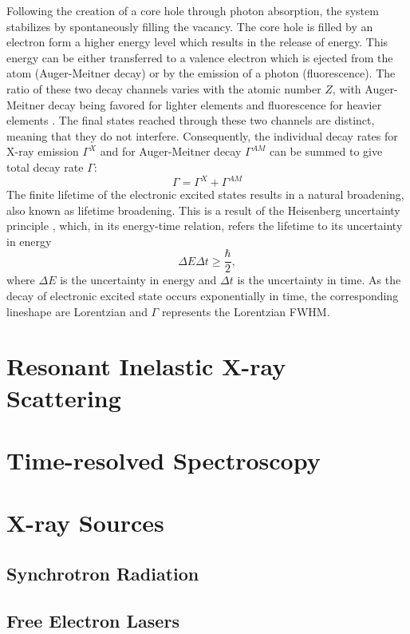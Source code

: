 Following the creation of a core hole through photon absorption, the system stabilizes by spontaneously filling the vacancy. The core hole is filled by an electron form a higher energy level which results in the release of energy. This energy can be either transferred to a valence electron which is ejected from the atom (Auger-Meitner decay) or by the emission of a photon (fluorescence). The ratio of these two decay channels varies with the atomic number $Z$, with Auger-Meitner decay being favored for lighter elements and fluorescence for heavier elements \cite{kotani2001resonant}. The final states reached through these two channels are distinct, meaning that they do not interfere. Consequently, the individual decay rates for X-ray emission $\Gamma^{X}$ and for Auger-Meitner decay $\Gamma^{AM}$ can be summed to give total decay rate $\Gamma$:
\begin{equation}
    \Gamma = \Gamma^{X} + \Gamma^{AM}
    \label{eq:decay_rate_XAS}
\end{equation}
The finite lifetime of the electronic excited states results in a natural broadening, also known as lifetime broadening. This is a result of the Heisenberg uncertainty principle \cite{heisenberg1927anschaulichen}, which, in its energy-time relation, refers the lifetime to its uncertainty in energy
\begin{equation}
    \Delta E \Delta t \geq  \frac{\hbar}{2},
    \label{eq:Heisenberg_uncertainty}
\end{equation}
where $\Delta E$ is the uncertainty in energy and $\Delta t$ is the uncertainty in time. As the decay of electronic excited state occurs exponentially in time, the corresponding lineshape are Lorentzian and $\Gamma$ represents the Lorentzian FWHM. 
\section{Resonant Inelastic X-ray Scattering}

\section{Time-resolved Spectroscopy}
\section{X-ray Sources}
\label{sec:X-ray_sources}
\subsection{Synchrotron Radiation}
\subsection{Free Electron Lasers}
